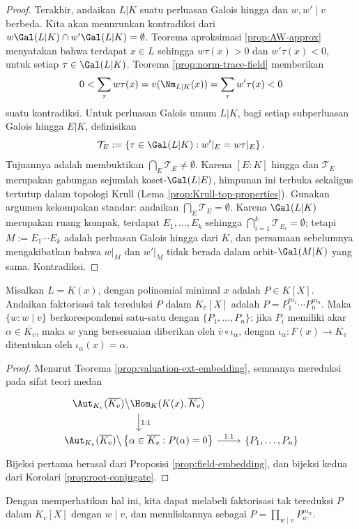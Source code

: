 \begin{proof}
	Terakhir, andaikan $L|K$ suatu perluasan Galois hingga dan $w, w' \mid v$ berbeda. Kita akan menurunkan kontradiksi dari $w \Gal(L|K) \cap w' \Gal(L|K) = \emptyset$. Teorema aproksimasi \ref{prop:AW-approx} menyatakan bahwa terdapat $x \in L$ sehingga $w\tau(x) > 0$ dan $w'\tau(x) < 0$, untuk setiap $\tau \in \Gal(L|K)$. Teorema \ref{prop:norm-trace-field} memberikan
	\[ 0 < \sum_\tau w\tau(x) = v(\Nm_{L|K}(x)) = \sum_\tau w'\tau(x) < 0 \]
	suatu kontradiksi. Untuk perluasan Galois umum $L|K$, bagi setiap subperluasan Galois hingga $E|K$, definisikan
	\[ \mathcal{T}_E := \left\{ \tau \in \Gal(L|K): w'|_E = w\tau|_E \right\}. \]
	Tujuannya adalah membuktikan $\bigcap_E \mathcal{T}_E \neq \emptyset$. Karena $[E:K]$ hingga dan $\mathcal{T}_E$ merupakan gabungan sejumlah koset-$\Gal(L|E)$, himpunan ini terbuka sekaligus tertutup dalam topologi Krull (Lema \ref{prop:Krull-top-properties}). Gunakan argumen kekompakan standar: andaikan $\bigcap_E \mathcal{T}_E = \emptyset$. Karena $\Gal(L|K)$ merupakan ruang kompak, terdapat $E_1, \ldots, E_k$ sehingga $\bigcap_{i=1}^k \mathcal{T}_{E_i} = \emptyset$; tetapi $M := E_1 \cdots E_k$ adalah perluasan Galois hingga dari $K$, dan persamaan sebelumnya mengakibatkan bahwa $w|_M$ dan $w'|_M$ tidak berada dalam orbit-$\Gal(M|K)$ yang sama. Kontradiksi.
\end{proof}

\begin{lemma}\label{prop:valuation-ext-irreducibles}
	Misalkan $L = K(x)$, dengan polinomial minimal $x$ adalah $P \in K[X]$. Andaikan faktorisasi tak tereduksi $P$ dalam $K_v[X]$ adalah $P = P_1^{m_1} \cdots P_n^{m_n}$. Maka $\{w: w \mid v\}$ berkorespondensi satu-satu dengan $\{P_1, \ldots, P_n\}$: jika $P_i$ memiliki akar $\alpha \in \overline{K_v}$, maka $w$ yang bersesuaian diberikan oleh $\bar{v} \circ \iota_\alpha$, dengan $\iota_\alpha: F(x) \to \overline{K_v}$ ditentukan oleh $\iota_\alpha(x) = \alpha$.
\end{lemma}
\begin{proof}
	Menurut Teorema \ref{prop:valuation-ext-embedding}, semuanya mereduksi pada sifat teori medan
	\[\begin{tikzcd}
		\Aut_{K_v}(\overline{K_v}) \big\backslash \Hom_K(K(x), \overline{K_v}) \arrow[d, "1:1"] & \\
		\Aut_{K_v}(\overline{K_v}) \big\backslash \left\{ \alpha \in \overline{K_v}: P(\alpha)=0 \right\} \arrow[r, "1:1"] & \{P_1, \ldots, P_n \}
	\end{tikzcd}\]
	Bijeksi pertama berasal dari Proposisi \ref{prop:field-embedding}, dan bijeksi kedua dari Korolari \ref{prop:root-conjugate}.
\end{proof}
Dengan memperhatikan hal ini, kita dapat melabeli faktorisasi tak tereduksi $P$ dalam $K_v[X]$ dengan $w \mid v$, dan menuliskannya sebagai $P = \prod_{w \mid v} P_w^{m_w}$.


